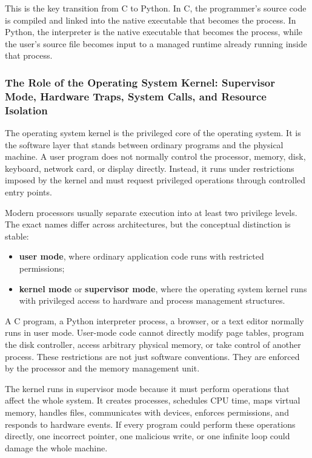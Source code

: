 \documentclass[a4paper,twoside]{report}
\begin{document}
This is the key transition from C to Python. In C, the programmer's source code is compiled and linked into the native executable that becomes the process. In Python, the interpreter is the native executable that becomes the process, while the user's source file becomes input to a managed runtime already running inside that process.

\subsubsection{The Role of the Operating System Kernel: Supervisor Mode, Hardware Traps, System Calls, and Resource Isolation}

The operating system kernel is the privileged core of the operating system. It is the software layer that stands between ordinary programs and the physical machine. A user program does not normally control the processor, memory, disk, keyboard, network card, or display directly. Instead, it runs under restrictions imposed by the kernel and must request privileged operations through controlled entry points.

Modern processors usually separate execution into at least two privilege levels. The exact names differ across architectures, but the conceptual distinction is stable:

\begin{itemize}
    \item \textbf{user mode}, where ordinary application code runs with restricted permissions;
    \item \textbf{kernel mode} or \textbf{supervisor mode}, where the operating system kernel runs with privileged access to hardware and process management structures.
\end{itemize}

A C program, a Python interpreter process, a browser, or a text editor normally runs in user mode. User-mode code cannot directly modify page tables, program the disk controller, access arbitrary physical memory, or take control of another process. These restrictions are not just software conventions. They are enforced by the processor and the memory management unit.

The kernel runs in supervisor mode because it must perform operations that affect the whole system. It creates processes, schedules CPU time, maps virtual memory, handles files, communicates with devices, enforces permissions, and responds to hardware events. If every program could perform these operations directly, one incorrect pointer, one malicious write, or one infinite loop could damage the whole machine.
\end{document}
